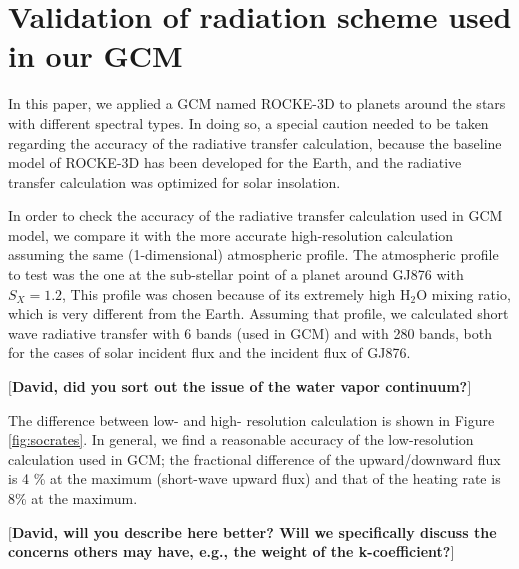 \documentclass[11pt,numberedappendix,twocolappendix,]{emulateapj}
\def\water{H$_2$O }
\def\memo#1{\color{red}$[${\bf #1}$]$ \color{black}}
\begin{document}
\appendix


\section{Validation of radiation scheme used in our GCM}
\label{ap:radiation}

In this paper, we applied a GCM named ROCKE-3D to planets around the stars with different spectral types. 
In doing so, a special caution needed to be taken regarding the accuracy of the radiative transfer calculation, because the baseline model of ROCKE-3D has been developed for the Earth, and the radiative transfer calculation was optimized for solar insolation. 

In order to check the accuracy of the radiative transfer calculation used in GCM model, we compare it with the more accurate high-resolution calculation assuming the same (1-dimensional) atmospheric profile. 
The atmospheric profile to test was the one at the sub-stellar point of a planet around GJ876 with $S_X=1.2$, 
This profile was chosen because of its extremely high \water mixing ratio, which is very different from the Earth. 
Assuming that profile, we calculated short wave radiative transfer with 6 bands (used in GCM) and with 280 bands, both for the cases of solar incident flux and the incident flux of GJ876. 

\memo{David, did you sort out the issue of the water vapor continuum?}

The difference between low- and high- resolution calculation is shown in Figure \ref{fig:socrates}. 
In general, we find a reasonable accuracy of the low-resolution calculation used in GCM; the fractional difference of the upward/downward flux is 4 \% at the maximum (short-wave upward flux) and that of the heating rate is 8\% at the maximum. 

\memo{David, will you describe here better? Will we specifically discuss the concerns others may have, e.g., the weight of the k-coefficient?}
\end{document}
